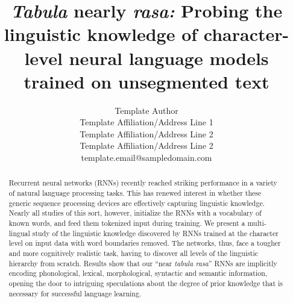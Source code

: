 %
\iftaclfinal
\newcommand{\taclpaper}{camera-ready\xspace}
\newcommand{\taclpapers}{camera-readies\xspace}
\newcommand{\Taclpaper}{Camera-ready\xspace}
\newcommand{\Taclpapers}{Camera-readies\xspace}
\else
\newcommand{\taclpaper}{submission\xspace}
\newcommand{\taclpapers}{{\taclpaper}s\xspace}
\newcommand{\Taclpaper}{Submission\xspace}
\newcommand{\Taclpapers}{{\Taclpaper}s\xspace}
\fi

\newif\iftaclinstructions
\taclinstructionsfalse %
\iftaclinstructions
\renewcommand{\confidential}{}
\renewcommand{\anonsubtext}{(No author info supplied here, for consistency with
TACL-submission anonymization requirements)}
\fi

\title{\emph{Tabula} nearly \emph{rasa:} Probing the linguistic knowledge of character-level neural language models trained on unsegmented text}


\author{
 Template Author \\
 Template Affiliation/Address Line 1 \\
 Template Affiliation/Address Line 2 \\
 Template Affiliation/Address Line 2 \\
  {\sf template.email@sampledomain.com} \\
}

\date{}


\maketitle
\begin{abstract}
Recurrent neural networks (RNNs) recently reached striking performance in a variety of natural language processing tasks. This has renewed interest in whether these generic sequence processing devices are effectively capturing linguistic knowledge. Nearly all studies of this sort, however, initialize the RNNs with a vocabulary of known words, and feed them tokenized input during training. We present a multi-lingual study of the linguistic knowledge discovered by RNNs trained at the character level on input data with word boundaries removed. The networks, thus, face a tougher and more cognitively realistic task, having to discover all levels of the linguistic hierarchy from scratch. Results show that our ``near \emph{tabula rasa}'' RNNs are implicitly encoding phonological, lexical, morphological, syntactic and semantic information, opening the door to intriguing speculations about the degree of prior knowledge that is necessary for successful language learning.
\end{abstract}


